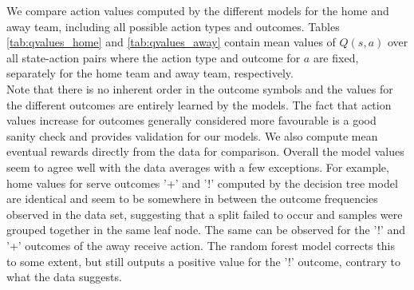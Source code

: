 \documentclass{sfuthesis}
\begin{document}
	We compare action values computed by the different models for the home and away team, including all possible action types and outcomes. Tables \ref{tab:qvalues_home} and \ref{tab:qvalues_away} contain mean values of $Q(s,a)$ over all state-action pairs where the action type and outcome for $a$ are fixed, separately for the home team and away team, respectively.\\
	Note that there is no inherent order in the outcome symbols and the values for the different outcomes are entirely learned by the models. The fact that action values increase for outcomes generally considered more favourable is a good sanity check and provides validation for our models. We also compute mean eventual rewards directly from the data for comparison. Overall the model values seem to agree well with the data averages with a few exceptions. For example, home values for serve outcomes '+' and '!' computed by the decision tree model are identical and seem to be somewhere in between the %
	outcome frequencies observed in the data set, suggesting that a split failed to occur and samples were grouped together in the same leaf node. The same can be observed for the '!' and '+' outcomes of the away receive action. The random forest model corrects this to some extent, but still outputs a positive value for the '!' outcome, contrary to what the data suggests.
	
\end{document}
